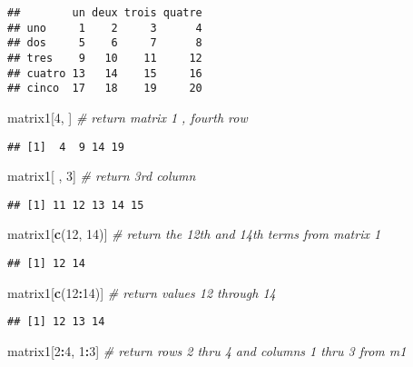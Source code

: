 \documentclass[
]{article}
\newenvironment{Shaded}{\begin{snugshade}}{\end{snugshade}}
\newcommand{\CommentTok}[1]{\textcolor[rgb]{0.56,0.35,0.01}{\textit{#1}}}
\newcommand{\DecValTok}[1]{\textcolor[rgb]{0.00,0.00,0.81}{#1}}
\newcommand{\KeywordTok}[1]{\textcolor[rgb]{0.13,0.29,0.53}{\textbf{#1}}}
\newcommand{\NormalTok}[1]{#1}
\newcommand{\OperatorTok}[1]{\textcolor[rgb]{0.81,0.36,0.00}{\textbf{#1}}}
\begin{document}
\begin{verbatim}
##        un deux trois quatre
## uno     1    2     3      4
## dos     5    6     7      8
## tres    9   10    11     12
## cuatro 13   14    15     16
## cinco  17   18    19     20
\end{verbatim}

\begin{Shaded}
\begin{Highlighting}[]
\NormalTok{matrix1[}\DecValTok{4}\NormalTok{, ] }\CommentTok{# return matrix 1 , fourth row}
\end{Highlighting}
\end{Shaded}

\begin{verbatim}
## [1]  4  9 14 19
\end{verbatim}

\begin{Shaded}
\begin{Highlighting}[]
\NormalTok{matrix1[ , }\DecValTok{3}\NormalTok{] }\CommentTok{# return 3rd column}
\end{Highlighting}
\end{Shaded}

\begin{verbatim}
## [1] 11 12 13 14 15
\end{verbatim}

\begin{Shaded}
\begin{Highlighting}[]
\NormalTok{matrix1[}\KeywordTok{c}\NormalTok{(}\DecValTok{12}\NormalTok{, }\DecValTok{14}\NormalTok{)] }\CommentTok{# return the 12th and 14th terms from matrix 1}
\end{Highlighting}
\end{Shaded}

\begin{verbatim}
## [1] 12 14
\end{verbatim}

\begin{Shaded}
\begin{Highlighting}[]
\NormalTok{matrix1[}\KeywordTok{c}\NormalTok{(}\DecValTok{12}\OperatorTok{:}\DecValTok{14}\NormalTok{)] }\CommentTok{# return values 12 through 14}
\end{Highlighting}
\end{Shaded}

\begin{verbatim}
## [1] 12 13 14
\end{verbatim}

\begin{Shaded}
\begin{Highlighting}[]
\NormalTok{matrix1[}\DecValTok{2}\OperatorTok{:}\DecValTok{4}\NormalTok{, }\DecValTok{1}\OperatorTok{:}\DecValTok{3}\NormalTok{] }\CommentTok{# return rows 2 thru 4 and columns 1 thru 3 from m1}
\end{Highlighting}
\end{Shaded}
\end{document}
